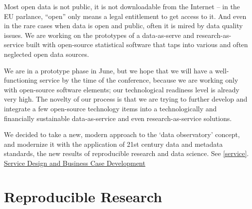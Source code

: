 \documentclass[
  a4paper,
  openany, a4paper, oneside]{book}
\begin{document}
Most open data is not public, it is not downloadable from the Internet -- in the EU parlance, ``open'' only means a legal entitlement to get access to it. And even in the rare cases when data is open and public, often it is mired by data quality issues. We are working on the prototypes of a data-as-serve and research-as-service built with open-source statistical software that taps into various and often neglected open data sources.

We are in a prototype phase in June, but we hope that we will have a well-functioning service by the time of the conference, because we are working only with open-source software elements; our technological readiness level is already very high. The novelty of our process is that we are trying to further develop and integrate a few open-source technology items into a technologically and financially sustainable data-as-service and even research-as-service solutions.

We decided to take a new, modern approach to the `data observatory' concept, and modernize it with the application of 21st century data and metadata standards, the new results of reproducible research and data science. See \ref{service}. \protect\hyperlink{service}{Service Design and Business Case Development}

\hypertarget{reproducible-research}{%
\section{Reproducible Research}\label{reproducible-research}}
\end{document}
